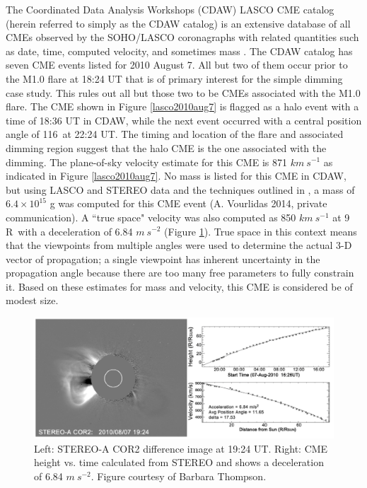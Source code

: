The Coordinated Data Analysis Workshops (CDAW) LASCO CME catalog (herein referred to simply as the CDAW catalog) is an extensive database of all CMEs observed by the SOHO/LASCO coronagraphs with related quantities such as date, time, computed velocity, and sometimes mass \citep{Gopalswamy2009}. The CDAW catalog has seven CME events listed for 2010 August 7. All but two of them occur prior to the M1.0 flare at 18:24 UT that is of primary interest for the simple dimming case study. This rules out all but those two to be CMEs associated with the M1.0 flare. The CME shown in Figure \ref{lasco2010aug7} is flagged as a halo event with a time of 18:36 UT in CDAW, while the next event occurred with a central position angle of 116\degree\ at 22:24 UT. The timing and location of the flare and associated dimming region suggest that the halo CME is the one associated with the dimming. The plane-of-sky velocity estimate for this CME is 871 $km\ s^{-1}$ as indicated in Figure \ref{lasco2010aug7}. No mass is listed for this CME in CDAW, but using LASCO and STEREO data and the techniques outlined in \citet{Colaninno2009}, a mass of $6.4 \times 10^{15}$ g was computed for this CME event (A. Vourlidas 2014, private communication). A ``true space" velocity was also computed as 850 $km\ s^{-1}$ at 9 R\astrosun\ with a deceleration of 6.84 $m\ s^{-2}$ (Figure \ref{stereo2010aug7}). True space in this context means that the viewpoints from multiple angles were used to determine the actual 3-D vector of propagation; a single viewpoint has inherent uncertainty in the propagation angle  because there are too many free parameters to fully constrain it. Based on these estimates for mass and velocity, this CME is considered be of modest size.

\begin{figure}[!h]
    \begin{center}
	    \includegraphics[width=150mm]{Images/Stereo2010Aug7Cme.png}
    \end{center}
    \caption[STEREO coronagraph data for 2010 August 7 event]{
        Left: STEREO-A COR2 difference image at 19:24 UT. Right: CME height vs. time calculated from STEREO and shows a 
        deceleration of 6.84 $m\ s^{-2}$. Figure courtesy of Barbara Thompson. 
	}
    \label{stereo2010aug7}
\end{figure}

